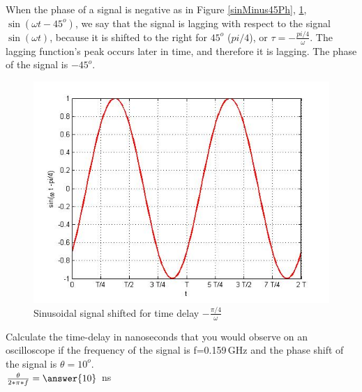 \documentclass{ximera}
\begin{document}
\begin{example}
\item When the phase of a signal is negative as in Figure \ref{sinMinus45Ph}, \ref{sinMinus45T},  $ \sin (\omega t - 45^o)$, we say that the signal is lagging with respect to the signal $ \sin (\omega t)$, because it is shifted to the right for $45^o$ ($pi/4$), or $\tau=-\frac{pi/4}{\omega} $. The lagging function's peak occurs later in time, and therefore it is lagging. The phase of the signal is $-45^o$.


\begin{figure}[htbp]
\begin{center}
\includegraphics[scale=0.4]{../jpg/cpef2.jpg}
\caption{ Sinusoidal signal shifted for time delay $-\frac{\pi/4}{\omega}$}
\label{sinMinus45T}
\end{center}
\end{figure}



\end{example}


\begin{question}  
Calculate the time-delay in nanoseconds that you would observe on an oscilloscope if the frequency of the signal is f=0.159\,GHz and the phase shift of the signal is $\theta=10^o$. \\
$ \frac{\theta}{2*\pi*f} = \answer{10}$  ns
\end{question} 
\end{document}
